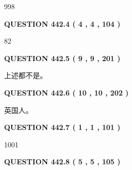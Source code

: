 \documentclass{ctexart}
\begin{document}
  
 
 
\noindent{}

998
 
 
  
\vspace{0.2in}
  
{\textbf{\Large{QUESTION
442.4 
 ( 4 , 4 , 104 )
}}}
  
  
 
 
\noindent{}

82
 
 
  
\vspace{0.2in}
  
{\textbf{\Large{QUESTION
442.5 
 ( 9 , 9 , 201 )
}}}
  
  
 
 
\noindent{}
 
 
 上述都不是。
 
 
 
 
  
\vspace{0.2in}
  
{\textbf{\Large{QUESTION
442.6 
 ( 10 , 10 , 202 )
}}}
  
  
 
 
\noindent{}
 
 
英国人。
 
 
 
 
  
\vspace{0.2in}
  
{\textbf{\Large{QUESTION
442.7 
 ( 1 , 1 , 101 )
}}}
  
  
 
 
\noindent{}

1001
 
 
  
\vspace{0.2in}
  
{\textbf{\Large{QUESTION
442.8 
 ( 5 , 5 , 105 )
}}}
  
  
 
 
\noindent{}
\end{document}
